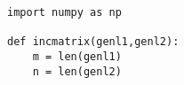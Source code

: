 \documentclass[border=2pt]{standalone}
\begin{document}
\begin{varwidth}{\linewidth}
\begin{lstlisting}
import numpy as np

def incmatrix(genl1,genl2):
    m = len(genl1)
    n = len(genl2)
\end{lstlisting}
\end{varwidth}
\end{document}
